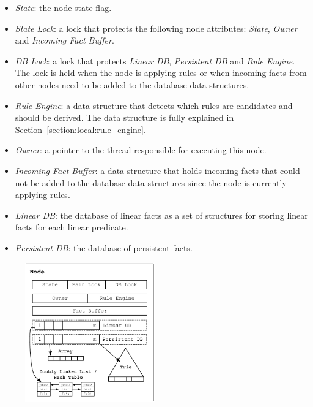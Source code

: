 \begin{itemize}
   \item \emph{State}: the node state flag.
   \item \emph{State Lock}: a lock that protects the following node attributes:
      \emph{State}, \emph{Owner} and \emph{Incoming Fact Buffer}.
   \item \emph{DB Lock}: a lock that protects \emph{Linear DB},
      \emph{Persistent DB} and \emph{Rule Engine}. The lock is held when the
      node is applying rules or when incoming facts from other nodes need to be added to the database data
      structures.
   \item \emph{Rule Engine}: a data structure that detects which rules are
      candidates and should be derived. The data structure is fully explained
      in Section~\ref{section:local:rule_engine}.
   \item \emph{Owner}: a pointer to the thread responsible for executing this
      node.
   \item \emph{Incoming Fact Buffer}: a data structure that holds incoming facts that
      could not be added to the database data structures since the node is
      currently applying rules.
   \item \emph{Linear DB}: the database of linear facts as a set of
      structures for storing linear facts for each linear predicate.
   \item \emph{Persistent DB}: the database of persistent facts.
\end{itemize}

\begin{figure}[t]
\centering
\includegraphics[width=0.5\textwidth]{figures/local/node.pdf}
\label{fig:local:node_overview}
\end{figure}

